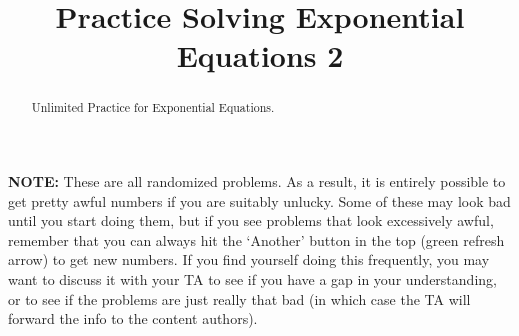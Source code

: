 \documentclass{ximeraXloud}
\title{Practice Solving Exponential Equations 2}
\begin{document}
\begin{abstract}
    Unlimited Practice for Exponential Equations.
\end{abstract}
\maketitle

\textbf{NOTE:} These are all randomized problems. As a result, it is entirely possible to get pretty awful numbers if you are suitably unlucky. Some of these may look bad until you start doing them, but if you see problems that look excessively awful, remember that you can always hit the `Another' button in the top (green refresh arrow) to get new numbers. If you find yourself doing this frequently, you may want to discuss it with your TA to see if you have a gap in your understanding, or to see if the problems are just really that bad (in which case the TA will forward the info to the content authors).

%
\end{document}
